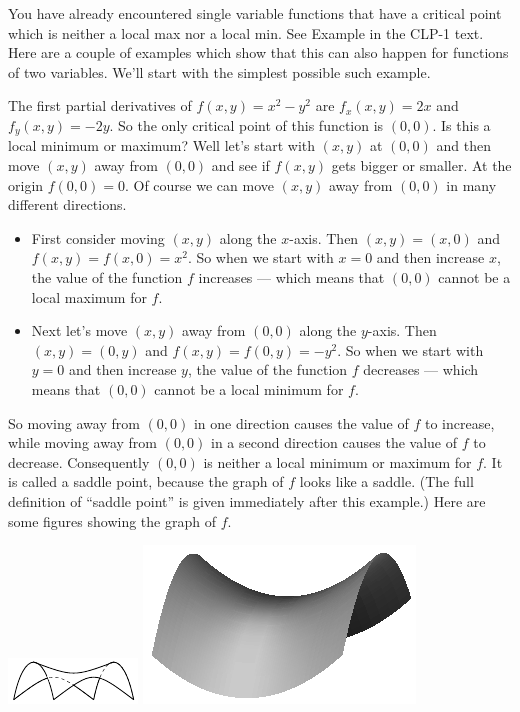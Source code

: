 You have already encountered single variable functions
that have a critical point which is neither a local max nor a local min. 
See Example  in the CLP-1 text.
Here are a couple of examples which show that this can also
happen for functions of two variables.
We'll start with the simplest possible such example.

\smallskip
\begin{eg}[$f(x,y)=x^2-y^2$]\label{eg maxminA}
The first partial derivatives of $f(x,y)=x^2-y^2$ are
$f_x(x,y)=2x$ and $f_y(x,y)=-2y$. So the only critical point of this function
is $(0,0)$. Is this a local minimum or maximum? Well let's start with $(x,y)$
at $(0,0)$ and then move $(x,y)$ away from $(0,0)$ and see if $f(x,y)$
gets bigger or smaller. At the origin $f(0,0)=0$. Of course we can move
$(x,y)$ away from $(0,0)$ in many different directions.
\begin{itemize}
\item
First consider moving $(x,y)$ along the $x$-axis. Then $(x,y)=(x,0)$ 
and  $f(x,y)=f(x,0)=x^2$.   So when we start with $x=0$ and then increase
$x$, the value of the function $f$ increases --- which means that $(0,0)$
cannot be a local maximum for $f$.
\item 
Next let's move $(x,y)$ away from $(0,0)$ along the $y$-axis. 
Then $(x,y)=(0,y)$ and  $f(x,y)=f(0,y)=-y^2$.   
So when we start with $y=0$ and then increase $y$, the value of the 
function $f$ decreases --- which means that  $(0,0)$ cannot be a local 
minimum for $f$.
\end{itemize}
So moving away from $(0,0)$ in one direction causes the value of $f$ to increase, while moving away from $(0,0)$ in a second direction causes 
the value of $f$ to decrease. Consequently
$(0,0)$ is neither a local minimum or maximum for $f$. It is called
a saddle point, because the graph of $f$ looks like a saddle. (The full
definition of ``saddle point'' is given immediately after this example.)
Here are some figures showing the graph of $f$.
\begin{efig}
\begin{center}
  \includegraphics[scale=3]{hyperbolic_paraboloid}\qquad
  \includegraphics{hypPara}

\end{center}
\end{efig}
\end{eg}
